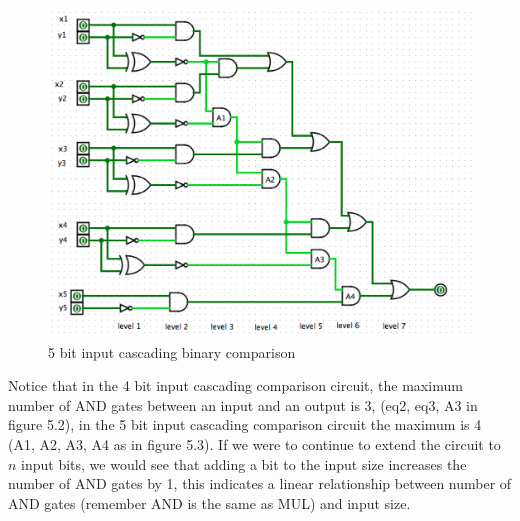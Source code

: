 \documentclass[12pt,twoside]{reedthesis}
\begin{document}
   \begin{figure}[htbp]
	   
	       \centering
	   \includegraphics[scale = .5]{comp2_5}
	     \caption{5 bit input cascading binary comparison}
	 \label{subd}
	\end{figure}
	
Notice that in the 4 bit input cascading comparison circuit, the maximum number of AND gates between an input and an output is 3, (eq2, eq3, A3 in figure 5.2), in the 5 bit input cascading comparison circuit the maximum is 4 (A1, A2, A3, A4 as in figure 5.3). If we were to continue to extend the circuit to $n$ input bits, we would see that adding a bit to the input size increases the number of AND gates by 1, this indicates a linear relationship between number of AND gates (remember AND is the same as MUL) and input size. 
 
\end{document}

